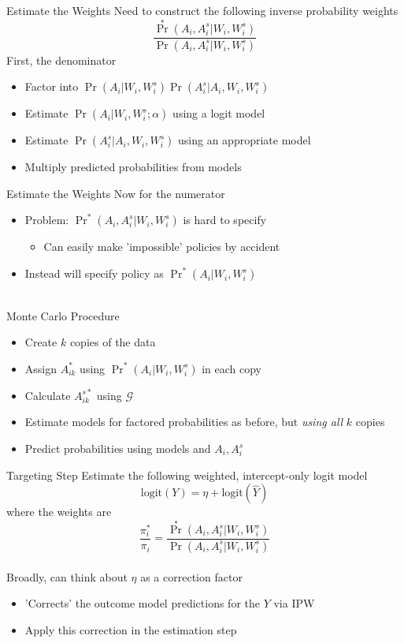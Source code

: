 \documentclass{beamer}
\begin{document}
\begin{frame}{Estimate the Weights}
	Need to construct the following inverse probability weights
	\[\frac{\Pr^*(A_i,A_i^s | W_i,W_i^s)}{\Pr(A_i,A_i^s | W_i,W_i^s)}\]
	First, the denominator
	\begin{itemize}
		\item Factor into $\Pr(A_i | W_i,W_i^s) \Pr(A_i^s | A_i,W_i,W_i^s)$
		\item Estimate $\Pr(A_i | W_i,W_i^s; \alpha)$ using a logit model
		\item Estimate $\Pr(A_i^s | A_i,W_i,W_i^s)$ using an appropriate model
		\item Multiply predicted probabilities from models
	\end{itemize}
\end{frame}

\begin{frame}{Estimate the Weights}
	Now for the numerator
	\begin{itemize}
		\item Problem: $\Pr^*(A_i,A_i^s | W_i,W_i^s)$ is hard to specify
		\begin{itemize}
			\item Can easily make 'impossible' policies by accident
		\end{itemize}
		\item Instead will specify policy as $\Pr^*(A_i | W_i,W_i^s)$
	\end{itemize}~\\
	Monte Carlo Procedure
	\begin{itemize}
		\item Create $k$ copies of the data
		\item Assign $A_{ik}^*$ using $\Pr^*(A_i | W_i,W_i^s)$ in each copy
		\item Calculate $A_{ik}^{s*}$ using $\mathcal{G}$
		\item Estimate models for factored probabilities as before, but \textit{using all} $k$ copies
		\item Predict probabilities using models and $A_i,A_i^s$
	\end{itemize}
\end{frame}

\begin{frame}{Targeting Step}
	Estimate the following weighted, intercept-only logit model
	\[\text{logit}(Y) = \eta + \text{logit}(\hat{Y})\]
	where the weights are
	\[\frac{\pi_i^*}{\pi_i} = \frac{\Pr^*(A_i,A_i^s | W_i,W_i^s)}{\Pr(A_i,A_i^s | W_i,W_i^s)}\]~\\
	Broadly, can think about $\eta$ as a correction factor
	\begin{itemize}
		\item 'Corrects' the outcome model predictions for the $Y$ via IPW
		\item Apply this correction in the estimation step
	\end{itemize}
\end{frame}
\end{document}
